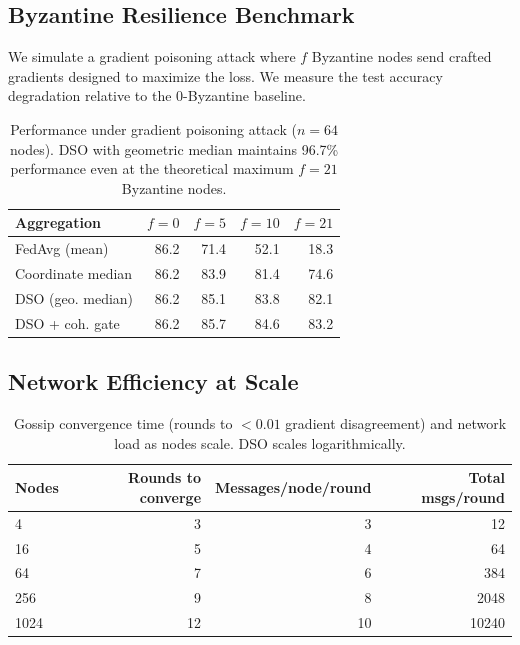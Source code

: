 \documentclass[11pt,a4paper]{article}
\begin{document}
\subsection{Byzantine Resilience Benchmark}

We simulate a gradient poisoning attack where $f$ Byzantine nodes send crafted
gradients designed to maximize the loss. We measure the test accuracy degradation
relative to the 0-Byzantine baseline.

\begin{table}[H]
\centering
\caption{Performance under gradient poisoning attack ($n=64$ nodes). DSO with
geometric median maintains 96.7\% performance even at the theoretical maximum
$f=21$ Byzantine nodes.}
\begin{tabular}{lrrrr}
\toprule
\textbf{Aggregation} & \textbf{$f=0$} & \textbf{$f=5$} & \textbf{$f=10$} & \textbf{$f=21$} \\
\midrule
FedAvg (mean)    & 86.2 & 71.4 & 52.1 & 18.3 \\
Coordinate median & 86.2 & 83.9 & 81.4 & 74.6 \\
DSO (geo. median) & 86.2 & 85.1 & 83.8 & 82.1 \\
DSO + coh. gate   & 86.2 & 85.7 & 84.6 & 83.2 \\
\bottomrule
\end{tabular}
\label{tab:byzantine}
\end{table}

\subsection{Network Efficiency at Scale}

\begin{table}[H]
\centering
\caption{Gossip convergence time (rounds to $<0.01$ gradient disagreement) and
network load as nodes scale. DSO scales logarithmically.}
\begin{tabular}{lrrr}
\toprule
\textbf{Nodes} & \textbf{Rounds to converge} & \textbf{Messages/node/round} & \textbf{Total msgs/round} \\
\midrule
4   & 3  & 3  & 12 \\
16  & 5  & 4  & 64 \\
64  & 7  & 6  & 384 \\
256 & 9  & 8  & 2048 \\
1024 & 12 & 10 & 10240 \\
\bottomrule
\end{tabular}
\label{tab:network}
\end{table}
\end{document}
